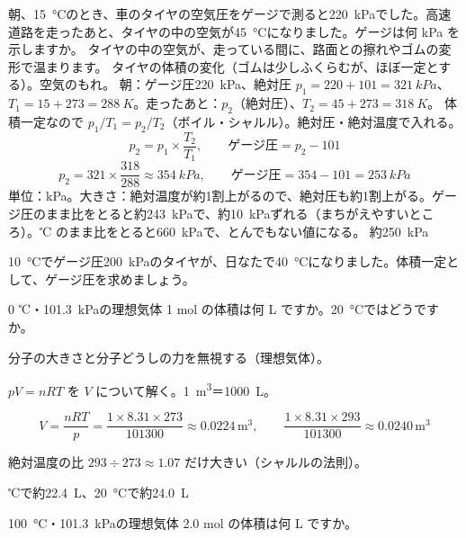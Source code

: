 \begin{phreidai}[走ったあとのタイヤの空気圧]
\label{ph:熱-3:ex2}朝、\qty{15}{\celsius}のとき、車のタイヤの空気圧をゲージで測ると\qty{220}{kPa}でした。高速道路を走ったあと、タイヤの中の空気が\qty{45}{\celsius}になりました。ゲージは何 kPa を示しますか。
\phbamen
タイヤの中の空気が、走っている間に、路面との擦れやゴムの変形で温まります。
\phmushi
タイヤの体積の変化（ゴムは少しふくらむが、ほぼ一定とする）。空気のもれ。
\phzu
朝：ゲージ圧\qty{220}{kPa}、絶対圧 $p_1=220+101=\qty{321}{kPa}$、$T_1=15+273=\qty{288}{K}$。走ったあと：$p_2$（絶対圧）、$T_2=45+273=\qty{318}{K}$。
\phriyu
体積一定なので $p_1/T_1=p_2/T_2$（ボイル・シャルル）。絶対圧・絶対温度で入れる。
\phtateru
\[ p_2=p_1\times\frac{T_2}{T_1},\qquad \text{ゲージ圧}=p_2-101 \]
\phtoku
\[ p_2=321\times\frac{318}{288}\approx\qty{354}{kPa},\qquad \text{ゲージ圧}=354-101=\qty{253}{kPa} \]
\phtashikame
単位：kPa。大きさ：絶対温度が約1割上がるので、絶対圧も約1割上がる。ゲージ圧のまま比をとると約\qty{243}{kPa}で、約\qty{10}{kPa}ずれる（まちがえやすいところ）。℃ のまま比をとると\qty{660}{kPa}で、とんでもない値になる。
\kotae 約\qty{250}{kPa}
\end{phreidai}
\begin{jibun}
\qty{10}{\celsius}でゲージ圧\qty{200}{kPa}のタイヤが、日なたで\qty{40}{\celsius}になりました。体積一定として、ゲージ圧を求めましょう。
\end{jibun}

\begin{reidai}
\label{ph:熱-3:ex3}0 ℃・\qty{101.3}{kPa}の理想気体 1 mol の体積は何 L ですか。\qty{20}{\celsius}ではどうですか。
\par{} 分子の大きさと分子どうしの力を無視する（理想気体）。
\par\kangaekata $pV=nRT$ を $V$ について解く。\qty{1}{m^3}＝\qty{1000}{L}。
\par\shiki
\[ V=\frac{nRT}{p}=\frac{1\times8.31\times273}{\num{101300}}\approx0.0224\,\mathrm{m^3},\qquad \frac{1\times8.31\times293}{\num{101300}}\approx0.0240\,\mathrm{m^3} \]
\par{} 絶対温度の比 $293\div273\approx1.07$ だけ大きい（シャルルの法則）。
\par{} ℃で約\qty{22.4}{L}、\qty{20}{\celsius}で約\qty{24.0}{L}
\end{reidai}
\begin{jibun}
\qty{100}{\celsius}・\qty{101.3}{kPa}の理想気体 2.0 mol の体積は何 L ですか。
\end{jibun}

